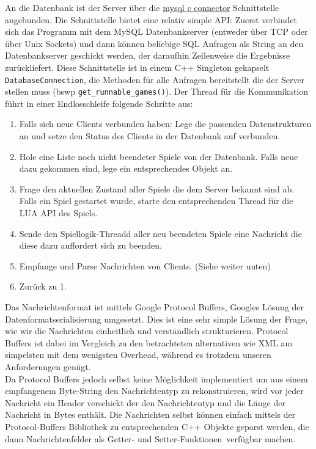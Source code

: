 An die Datenbank ist der Server über die \href{https://dev.mysql.com/doc/connector-c/en/connector-c-introduction.html}{mysql c connector} Schnittstelle angebunden. Die Schnittstelle bietet eine relativ simple API: Zuerst verbindet sich das Programm mit dem MySQL Datenbankserver (entweder über TCP oder über Unix Sockets) und dann können beliebige SQL Anfragen als String an den Datenbankserver geschickt werden, der daraufhin Zeilenweise die Ergebnisse zurückliefert.
Diese Schnittstelle ist in einem C++ Singleton gekapselt \texttt{DatabaseConnection}, die Methoden für alle Anfragen
bereitstellt die der Server stellen muss (bswp \texttt{get\_runnable\_games()}). \newline
\newline
Der Thread für die Kommunikation führt in einer Endlosschleife folgende Schritte aus:
\begin{enumerate}
    \item Falls sich neue Clients verbunden haben: Lege die passenden Datenstrukturen an und setze den Status des Clients in der Datenbank auf verbunden.
    \item Hole eine Liste noch nicht beendeter Spiele von der Datenbank. Falls neue dazu gekommen sind, lege ein entsprechendes Objekt an.
    \item Frage den aktuellen Zustand aller Spiele die dem Server bekannt sind ab. Falls ein Spiel gestartet wurde, starte den entsprechenden Thread für die LUA API des Spiels.
    \item Sende den Spiellogik-Threadd aller neu beendeten Spiele eine Nachricht die diese dazu auffordert sich zu beenden.
    \item Empfange und Parse Nachrichten von Clients. (Siehe weiter unten)
    \item Zurück zu 1.
\end{enumerate}

Das Nachrichtenformat ist mittels Google Protocol Buffers, Googles Lösung der Datenformatserialisierung umgesetzt. Dies ist eine sehr simple Lösung der Frage, wie wir die Nachrichten einheitlich und verständlich strukturieren. Protocol Buffers ist dabei im Vergleich zu den betrachteten alternativen wie XML am simpelsten mit dem wenigsten Overhead, während es trotzdem unseren Anforderungen genügt.\\
 Da Protocol Buffers jedoch selbst keine Möglichkeit
implementiert um aus einem empfangenem Byte-String den Nachrichtentyp zu rekonstruieren, wird vor jeder Nachricht
ein Header verschickt der den Nachrichtentyp und die Länge der Nachricht in Bytes enthält.
Die Nachrichten selbst können einfach mittels der Protocol-Buffers Bibliothek zu entsprechenden C++ Objekte geparst werden, die dann Nachrichtenfelder als \glqq Getter- und Setter-Funktionen\grqq \, verfügbar machen.

